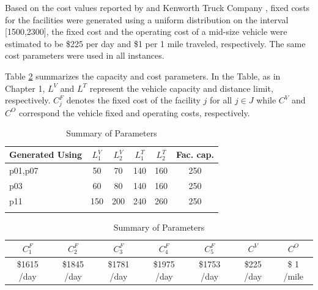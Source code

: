 Based on the cost values reported by \citet{Burlett} and  Kenworth Truck Company
\citeyearpar{Kenworth}, fixed costs for the facilities were generated
using a uniform distribution on the interval [1500,2300],
the fixed cost and the operating cost of a mid-size vehicle were estimated to be
\$225 per day and \$1 per 1 mile traveled, respectively.
The same cost parameters were used in all instances.

Table \ref{probparam} summarizes the capacity and cost parameters. In the Table,
as in Chapter 1, $L^V$ and $L^T$ represent the vehicle capacity and distance limit,
respectively. $C^F_j$ denotes the fixed cost of the facility $j$ for all $j \in J$
while $C^V$ and $C^O$ correspond the vehicle fixed and operating costs, respectively.
\begin {table}[h]
\begin{center}
\caption {Summary of Parameters} \label{probparam}
\begin {tabular}[t]{lccccc}
Generated Using & $L^V_1$   & $L^V_2$ & $L^T_1$ & $L^T_2$ & Fac. cap.\\\hline
p01,p07 &   50  &   70  &   140 &   160 &   250 \\
p03 &   60  &   80  &   140 &   160 &   250\\
p11 &   150 &   200 &   240 &   260 &   250\\\hline
\\
\end{tabular}
\begin {tabular}[t]{ccccccc}
$C^F_1$ & $C^F_2$ & $C^F_3$ &$C^F_4$ & $C^F_5$ & $C^V$ & $C^O$ \\\hline
\$1615 /day  &  \$1845 /day  &  \$1781 /day  &  \$1975 /day  &  \$1753 /day  &  \$225 /day  & \$ 1 /mile \\\hline
\end{tabular}
\end{center}
\end{table}

